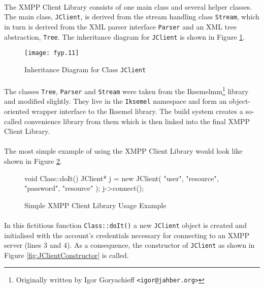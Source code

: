\paragraph{}
The XMPP Client Library consists of one main class and several helper classes. The main class, \texttt{JClient}, is derived from the stream handling class \texttt{Stream}, which in turn is derived from the XML parser interface \texttt{Parser} and an XML tree abstraction, \texttt{Tree}. The inheritance diagram for \texttt{JClient} is shown in Figure \ref{fig:inhjclient}.

\begin{figure}[H]
\begin{center}
\texttt{[image: fyp.11]}
\end{center}
\caption{Inheritance Diagram for Class \texttt{JClient}}
\label{fig:inhjclient}
\end{figure}

\paragraph{}
The classes \texttt{Tree}, \texttt{Parser} and \texttt{Stream} were taken from the Iksemelmm\footnote{Originally written by Igor Goryachieff \texttt{<igor@jahber.org>}} library and modified slightly. They live in the \texttt{Iksemel} namespace and form an object-oriented wrapper interface to the Iksemel library. The build system creates a so-called convenience library from them which is then linked into the final XMPP Client Library.

\paragraph{}
The most simple example of using the XMPP Client Library would look like shown in Figure \ref{fig:usageExample}.

\begin{figure}[H]
\begin{listing}{1}
void Class::doIt()
{
  JClient* j = new JClient( "user", "resource",
                            "password", "resource" );
  j->connect();
}
\end{listing}
\caption{Simple XMPP Client Library Usage Example}
\label{fig:usageExample}
\end{figure}

\paragraph{}
In this fictitious function \texttt{Class::doIt()} a new \texttt{JClient} object is created and initialised with the account's credentials necessary for connecting to an XMPP server (lines 3 and 4). As a consequence, the constructor of \texttt{JClient} as shown in Figure \ref{fig:JClientConstructor} is called.

